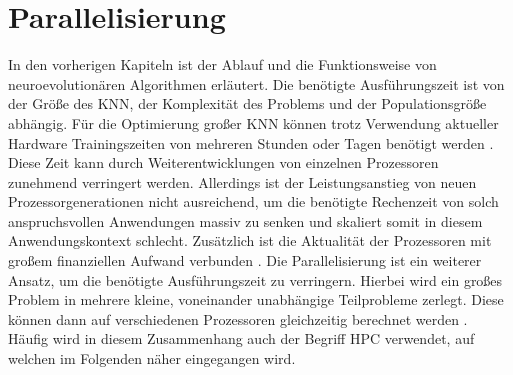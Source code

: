 \section{Parallelisierung}
\label{sec:parallel}
In den vorherigen Kapiteln ist der Ablauf und die Funktionsweise von neuroevolutionären Algorithmen erläutert. Die benötigte Ausführungszeit ist von der Größe des \ac{KNN}, der Komplexität des Problems und der Populationsgröße abhängig. Für die Optimierung großer \ac{KNN} können trotz Verwendung aktueller Hardware Trainingszeiten von mehreren Stunden oder Tagen benötigt werden \cite{such2017deep}. Diese Zeit kann durch Weiterentwicklungen von einzelnen Prozessoren zunehmend verringert werden. Allerdings ist der Leistungsanstieg von neuen Prozessorgenerationen nicht ausreichend, um die benötigte Rechenzeit von solch anspruchsvollen Anwendungen massiv zu senken und skaliert somit in diesem Anwendungskontext schlecht. Zusätzlich ist die Aktualität der Prozessoren mit großem finanziellen Aufwand verbunden \cite{swann2002maximum}. Die Parallelisierung ist ein weiterer Ansatz, um die benötigte Ausführungszeit zu verringern. Hierbei wird ein großes Problem in mehrere kleine, voneinander unabhängige Teilprobleme zerlegt. Diese können dann auf verschiedenen Prozessoren gleichzeitig berechnet werden \cite{swann2002maximum}. Häufig wird in diesem Zusammenhang auch der Begriff \ac{HPC} verwendet, auf welchen im Folgenden näher eingegangen wird.

